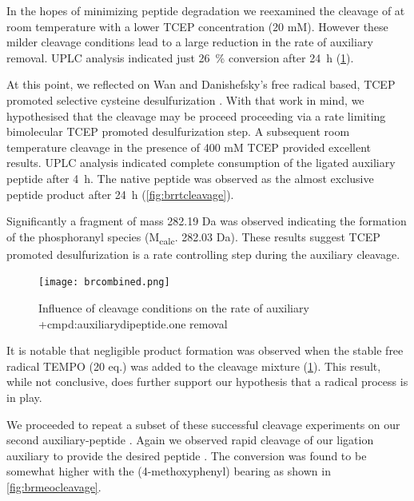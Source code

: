     In the hopes of minimizing peptide degradation we reexamined the cleavage of  at room temperature with a lower TCEP concentration (20 mM). However these milder cleavage conditions lead to a large reduction in the rate of auxiliary removal. UPLC analysis indicated just \SI{26}{\percent} conversion after \SI{24}{\hour} (\ref{fig:brcleavage}).

    At this point, we reflected on Wan and Danishefsky's free radical based, TCEP promoted selective cysteine desulfurization \cite{wan_free-radical-based_2007}. With that work in mind, we hypothesised that the cleavage may be proceed proceeding via a rate limiting bimolecular TCEP promoted desulfurization step. A subsequent room temperature cleavage in the presence of 400 mM TCEP provided excellent results.  UPLC analysis indicated complete consumption of the ligated auxiliary peptide  after \SI{4}{\hour}. The native peptide  was observed as the almost exclusive peptide product after \SI{24}{\hour} (\ref{fig:brrtcleavage}).

    Significantly a fragment of mass 282.19 Da was observed indicating the formation of the phosphoranyl species  (M\textsubscript{calc}. 282.03 Da). These results suggest TCEP promoted desulfurization is a rate controlling step during the auxiliary cleavage.

    \begin{figure}[!htpb]
        \texttt{[image: brcombined.png]}
        \caption{Influence of cleavage conditions on the rate of auxiliary \cmpd+{cmpd:auxiliarydipeptide.one} removal}
        \label{fig:brcleavage}
    \end{figure}

    It is notable that negligible product formation was observed when the stable free radical TEMPO (20 eq.) was added to the cleavage mixture (\ref{fig:brcleavage}). This result, while not conclusive, does further support our hypothesis that a radical process is in play.

    We proceeded to repeat a subset of these successful cleavage experiments on our second auxiliary-peptide . Again we observed rapid cleavage of our ligation auxiliary to provide the desired peptide . The conversion was found to be somewhat higher with the (4-methoxyphenyl) bearing  as shown in \ref{fig:brmeocleavage}.

